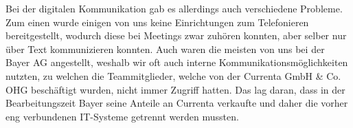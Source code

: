 Bei der digitalen Kommunikation gab es allerdings auch verschiedene Probleme. Zum einen wurde einigen von uns keine Einrichtungen zum Telefonieren bereitgestellt, wodurch diese bei Meetings zwar zuhören konnten, aber selber nur über Text kommunizieren konnten. Auch waren die meisten von uns bei der Bayer AG angestellt, weshalb wir oft auch interne Kommunikationsmöglichkeiten nutzten, zu welchen die Teammitglieder, welche von der Currenta GmbH \& Co. OHG beschäftigt wurden, nicht immer Zugriff hatten. Das lag daran, dass in der Bearbeitungszeit Bayer seine Anteile an Currenta verkaufte und daher die vorher eng verbundenen IT-Systeme getrennt werden mussten.